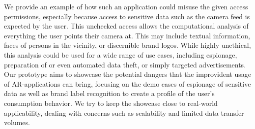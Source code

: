 We provide an example of how such an application could misuse the given access permissions, especially because access to sensitive data such as the camera feed is expected by the user.
This unchecked access allows the computational analysis of everything the user points their camera at.
This may include textual information, faces of persons in the vicinity, or discernible brand logos.
While highly unethical, this analysis could be used for a wide range of use cases, including espionage, preparation of or even automated data theft, or simply targeted advertisements.
Our prototype aims to showcase the potential dangers that the improvident usage of AR-applications can bring, focusing on the demo cases of espionage of sensitive data as well as brand label recognition to create a profile of the user's consumption behavior.
We try to keep the showcase close to real-world applicability, dealing with concerns such as scalability and limited data transfer volumes.

